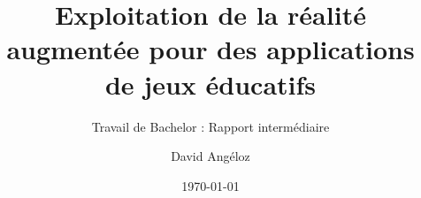 \author{David Angéloz}

\setmale

\title{ Exploitation de la réalité augmentée pour des applications de jeux éducatifs }

\subtitle{Travail de Bachelor : Rapport intermédiaire}


\date{\today}

